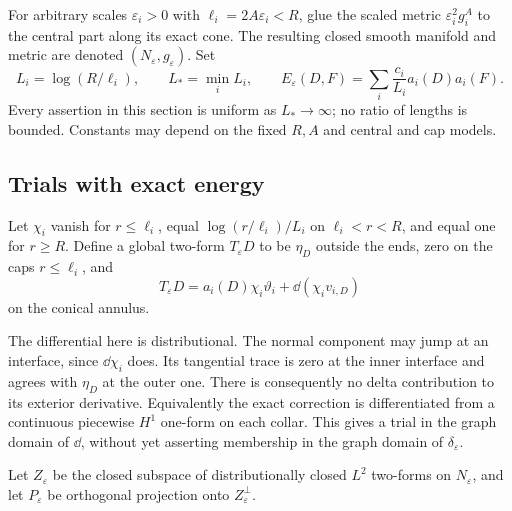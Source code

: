 For arbitrary scales $\varepsilon_i>0$ with
$\ell_i=2A\varepsilon_i<R$, glue the scaled metric
$\varepsilon_i^2g_i^A$ to the central part along its exact cone.
The resulting closed smooth manifold and metric are denoted
$(N_\varepsilon,g_\varepsilon)$. Set
\begin{equation}\label{eq:model-lengths-energy}
 L_i=\log(R/\ell_i),\qquad L_*=\min_iL_i,\qquad
 E_\varepsilon(D,F)
     =\sum_i\frac{c_i}{L_i}a_i(D)a_i(F).
\end{equation}
Every assertion in this section is uniform as $L_*\to\infty$;
no ratio of lengths is bounded. Constants may depend on the fixed
$R,A$ and central and cap models.

\subsection{Trials with exact energy}

Let $\chi_i$ vanish for $r\le\ell_i$, equal
$\log(r/\ell_i)/L_i$ on $\ell_i<r<R$, and equal one for $r\ge R$.
Define a global two-form $T_\varepsilon D$ to be $\eta_D$ outside
the ends, zero on the caps $r\le\ell_i$, and
\begin{equation}\label{eq:corrected-trial}
 T_\varepsilon D
   =a_i(D)\chi_i\vartheta_i+\dd(\chi_i v_{i,D})
\end{equation}
on the conical annulus.

The differential here is distributional. The normal component may jump
at an interface, since $\dd\chi_i$ does. Its tangential trace is zero
at the inner interface and agrees with $\eta_D$ at the outer one.
There is consequently no delta contribution to its exterior derivative.
Equivalently the exact correction is differentiated from a continuous
piecewise $H^1$ one-form on each collar. This gives a trial in the graph
domain of $\dd$, without yet asserting membership in the graph domain
of $\delta_\varepsilon$.

Let $Z_\varepsilon$ be the closed subspace of distributionally closed
$L^2$ two-forms on $N_\varepsilon$, and let $P_\varepsilon$ be
orthogonal projection onto $Z_\varepsilon^\perp$.

